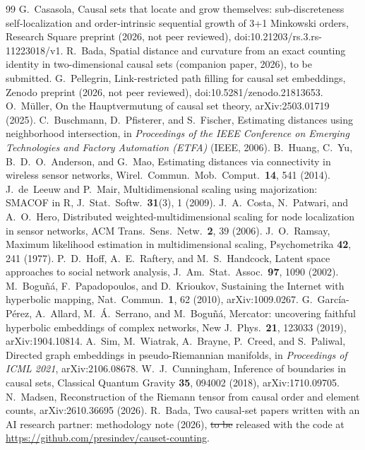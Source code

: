 \documentclass[prd,twocolumn,superscriptaddress,nofootinbib,amsmath,amssymb,floatfix]{revtex4-2}
\makeatletter
\providecommand{\DIFdeltex}[1]{{\protect\color{red}\sout{#1}}} %
\providecommand{\DIFdelbegin}{} %
\providecommand{\DIFdelend}{} %
\providecommand{\DIFdel}[1]{\texorpdfstring{\DIFdeltex{#1}}{}} %
\providecommand{\DIFscaledelfig}{0.5}
\newlength{\DIFdelgraphicswidth} %
\newlength{\DIFdelgraphicsheight} %
\providecommand{\DIFdelincludegraphics}[2][]{%
\sbox{\DIFdelgraphicsbox}{\DIFOincludegraphics[#1]{#2}}%
\settoboxwidth{\DIFdelgraphicswidth}{\DIFdelgraphicsbox} %
\settoboxtotalheight{\DIFdelgraphicsheight}{\DIFdelgraphicsbox} %
\scalebox{\DIFscaledelfig}{%
\parbox[b]{\DIFdelgraphicswidth}{\usebox{\DIFdelgraphicsbox}\\[-\baselineskip] \rule{\DIFdelgraphicswidth}{0em}}\llap{\resizebox{\DIFdelgraphicswidth}{\DIFdelgraphicsheight}{%
\setlength{\unitlength}{\DIFdelgraphicswidth}%
\begin{picture}(1,1)%
\thicklines\linethickness{2pt} %
{\color[rgb]{1,0,0}\put(0,0){\framebox(1,1){}}}%
{\color[rgb]{1,0,0}\put(0,0){\line( 1,1){1}}}%
{\color[rgb]{1,0,0}\put(0,1){\line(1,-1){1}}}%
\end{picture}%
}\hspace*{3pt}}} %
} %
\DeclareRobustCommand{\DIFdelbegin}{\DIFOdelbegin \let\includegraphics\DIFdelincludegraphics} %
\DeclareRobustCommand{\DIFdelend}{\DIFOaddend \let\includegraphics\DIFOincludegraphics} %
\let\sout@orig\sout %
\renewcommand{\sout}[1]{\ifmmode\text{\sout@orig{\ensuremath{#1}}}\else\sout@orig{#1}\fi} %
\makeatother
\begin{document}
\begin{thebibliography}{99}
 G.~Casasola, Causal sets that locate and grow themselves: sub-discreteness self-localization and order-intrinsic sequential growth of 3+1 Minkowski orders, Research Square preprint (2026, not peer reviewed), doi:10.21203/rs.3.rs-11223018/v1.
 R.~Bada, Spatial distance and curvature from an exact counting identity in two-dimensional causal sets (companion paper, 2026), to be submitted.
 G.~Pellegrin, Link-restricted path filling for causal set embeddings, Zenodo preprint (2026, not peer reviewed), doi:10.5281/zenodo.21813653.
 O.~M\"uller, On the Hauptvermutung of causal set theory, arXiv:2503.01719 (2025).
 C.~Buschmann, D.~Pfisterer, and S.~Fischer, Estimating distances using neighborhood intersection, in \emph{Proceedings of the IEEE Conference on Emerging Technologies and Factory Automation (ETFA)} (IEEE, 2006).
 B.~Huang, C.~Yu, B.~D.~O.~Anderson, and G.~Mao, Estimating distances via connectivity in wireless sensor networks, Wirel.\ Commun.\ Mob.\ Comput.\ \textbf{14}, 541 (2014).
 J.~de~Leeuw and P.~Mair, Multidimensional scaling using majorization: SMACOF in R, J.\ Stat.\ Softw.\ \textbf{31}(3), 1 (2009).
 J.~A.~Costa, N.~Patwari, and A.~O.~Hero, Distributed weighted-multidimensional scaling for node localization in sensor networks, ACM Trans.\ Sens.\ Netw.\ \textbf{2}, 39 (2006).
 J.~O.~Ramsay, Maximum likelihood estimation in multidimensional scaling, Psychometrika \textbf{42}, 241 (1977).
 P.~D.~Hoff, A.~E.~Raftery, and M.~S.~Handcock, Latent space approaches to social network analysis, J.\ Am.\ Stat.\ Assoc.\ \textbf{97}, 1090 (2002).
 M.~Bogu\~n\'a, F.~Papadopoulos, and D.~Krioukov, Sustaining the Internet with hyperbolic mapping, Nat.\ Commun.\ \textbf{1}, 62 (2010), arXiv:1009.0267.
 G.~Garc\'ia-P\'erez, A.~Allard, M.~\'A.~Serrano, and M.~Bogu\~n\'a, Mercator: uncovering faithful hyperbolic embeddings of complex networks, New J.\ Phys.\ \textbf{21}, 123033 (2019), arXiv:1904.10814.
 A.~Sim, M.~Wiatrak, A.~Brayne, P.~Creed, and S.~Paliwal, Directed graph embeddings in pseudo-Riemannian manifolds, in \emph{Proceedings of ICML 2021}, arXiv:2106.08678.
 W.~J.~Cunningham, Inference of boundaries in causal sets, Classical Quantum Gravity \textbf{35}, 094002 (2018), arXiv:1710.09705.
 N.~Madsen, Reconstruction of the Riemann tensor from causal order and element counts, arXiv:2610.36695 (2026).
 R.~Bada, Two causal-set papers written with an AI research partner: methodology note (2026), \DIFdelbegin \DIFdel{to be }\DIFdelend released with the code at \url{https://github.com/presindev/causet-counting}.
\end{thebibliography}
\end{document}
